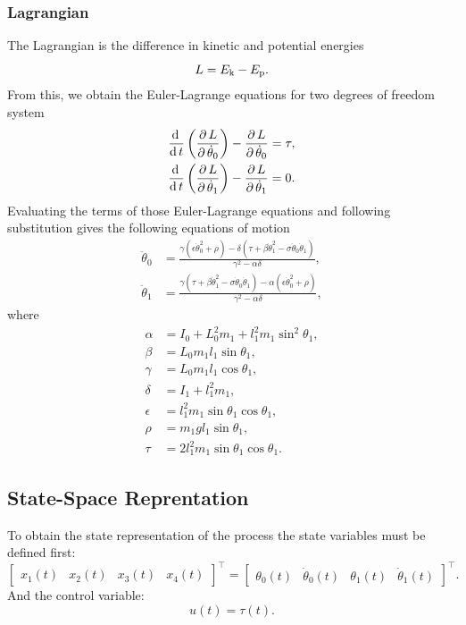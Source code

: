 \subsubsection{Lagrangian}
The Lagrangian is the difference in kinetic and potential energies
\begin{equation}
	L = E _{\text{k}} - E _{\text{p}}.
\end{equation}
From this, we obtain the Euler-Lagrange equations for two degrees of freedom system
\begin{subequations}
	\begin{align}
		\frac{\mathrm{d}\, }{\mathrm{d}\, t}\left( \frac{\partial\, L}{\partial\, \dot{\theta}_0} \right)-\frac{\partial\, L}{\partial\, \dot{\theta}_0} = \tau,\\
		\frac{\mathrm{d}\, }{\mathrm{d}\, t}\left( \frac{\partial\, L}{\partial\, \dot{\theta}_1} \right)-\frac{\partial\, L}{\partial\, \dot{\theta}_1} = 0.
	\end{align}
\end{subequations}
Evaluating the terms of those Euler-Lagrange equations and following substitution gives the following equations of motion
\begin{subequations}
	\begin{align}
	\ddot{\theta}_0 &= \frac{\gamma(\epsilon\dot{\theta}_0^2+\rho)-\delta(\tau+\beta\dot{\theta}_1^2-\sigma\dot{\theta}_0\dot{\theta}_1)}{\gamma^2-\alpha\delta}\label{motion1},\\
	\ddot{\theta}_1 &= \frac{\gamma(\tau+\beta\dot{\theta}_1^2-\sigma\dot{\theta}_0\dot{\theta}_1)-\alpha(\epsilon\dot{\theta}_0^2+\rho)}{\gamma^2-\alpha\delta}\label{motion2},
	\end{align}
\end{subequations}
where
\begin{subequations}
	\begin{align}
	\alpha &= I_0+L_0^2m_1+l_1^2m_1\sin^2\theta_1,\\
	\beta &= L_0m_1l_1\sin\theta_1, \\
	\gamma &= L_0m_1l_1\cos\theta_1,\\
	\delta &= I_1+l_1^2m_1,\\
	\epsilon &= l^2_1m_1\sin\theta_1\cos\theta_1,\\
	\rho &= m_1gl_1\sin\theta_1,\\
	\tau &= 2l^2_1m_1\sin\theta_1\cos\theta_1.
	\end{align}
\end{subequations}
\subsection{State-Space Reprentation} 
To obtain the state representation of the process the state variables must be defined first:
\begin{equation}
\begin{bmatrix}
x_1(t)&x_2(t)&x_3(t)&x_4(t)
\end{bmatrix}^\intercal = 
\begin{bmatrix}
\theta_0(t)&\dot{\theta}_0(t)&\theta_1(t)&\dot{\theta}_1(t)
\end{bmatrix}^\intercal.
\end{equation}
And the control variable:
\begin{equation} u(t) = \tau(t). \end{equation}
